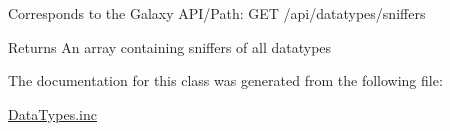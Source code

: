 Corresponds to the Galaxy A\+P\+I/\+Path\+: G\+ET /api/datatypes/sniffers

\begin{DoxyReturn}{Returns}
An array containing sniffers of all datatypes 
\end{DoxyReturn}


The documentation for this class was generated from the following file\+:\begin{DoxyCompactItemize}
\item 
\hyperlink{DataTypes_8inc}{Data\+Types.\+inc}\end{DoxyCompactItemize}
